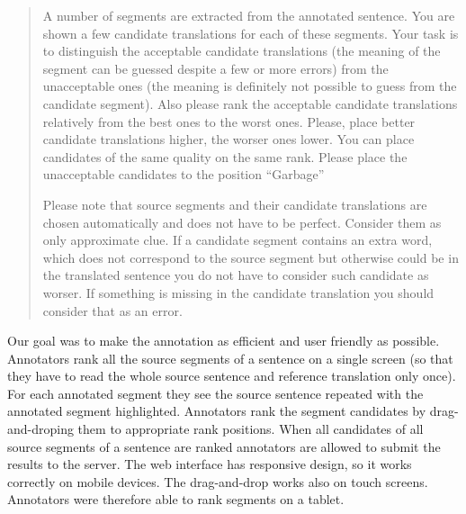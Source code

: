 \begin{quote}
A number of segments are extracted from the annotated sentence. You are shown a
few candidate translations for each of these segments. Your task is to
distinguish the acceptable candidate translations (the meaning of the segment
can be guessed despite a few or more errors) from the unacceptable ones (the
meaning is definitely not possible to guess from the candidate segment). Also
please rank the acceptable candidate translations relatively from the best ones
to the worst ones.  Please, place better candidate translations higher, the
worser ones lower. You can place candidates of the same quality on the same
rank. Please place the unacceptable candidates to the position ``Garbage''

Please note that source segments and their candidate translations are chosen
automatically and does not have to be perfect. Consider them as only
approximate clue. If a candidate segment contains an extra word, which does not
correspond to the source segment but otherwise could be in the translated
sentence you do not have to consider such candidate as worser. If something is
missing in the candidate translation you should consider that as an error.
\end{quote}

Our goal was to make the annotation as efficient and user friendly as possible.
Annotators rank all the source segments of a sentence on a single screen (so
that they have to read the whole source sentence and reference translation only
once). For each annotated segment they see the source sentence repeated with
the annotated segment highlighted. Annotators rank the segment candidates by
drag-and-droping them to appropriate rank positions. When all candidates of all
source segments of a sentence are ranked annotators are allowed to submit the
results to the server.  The web interface has responsive design, so it works
correctly on mobile devices.  The drag-and-drop works also on touch screens.
Annotators were therefore able to rank segments on a tablet.


